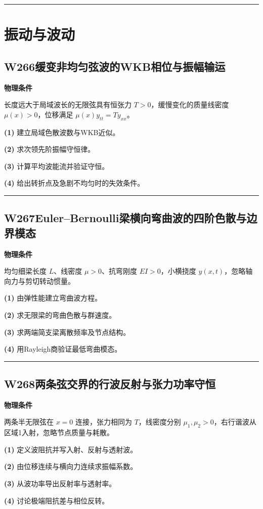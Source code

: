 \documentclass[UTF8,a4paper,11pt,oneside,openany]{ctexbook}
\begin{document}
\par\bigskip\hrule\bigskip
\chapter{振动与波动}
\section*{W266\quad 缓变非均匀弦波的WKB相位与振幅输运}
\textbf{物理条件}\par 长度远大于局域波长的无限弦具有恒张力 \(T>0\)，缓慢变化的质量线密度 \(\mu(x)>0\)，位移满足 \(\mu(x)y_{tt}=Ty_{xx}\)。
\par\noindent\textbf{(1)} 建立局域色散波数与WKB近似。
\par\noindent\textbf{(2)} 求次领先阶振幅守恒律。
\par\noindent\textbf{(3)} 计算平均波能流并验证守恒。
\par\noindent\textbf{(4)} 给出转折点及急剧不均匀时的失效条件。

\par\bigskip\hrule\bigskip
\section*{W267\quad Euler–Bernoulli梁横向弯曲波的四阶色散与边界模态}
\textbf{物理条件}\par 均匀细梁长度 \(L\)、线密度 \(\mu>0\)、抗弯刚度 \(EI>0\)，小横挠度 \(y(x,t)\)，忽略轴向力与剪切转动惯量。
\par\noindent\textbf{(1)} 由弹性能建立弯曲波方程。
\par\noindent\textbf{(2)} 求无限梁的弯曲色散与群速度。
\par\noindent\textbf{(3)} 求两端简支梁离散频率及节点结构。
\par\noindent\textbf{(4)} 用Rayleigh商验证最低弯曲模态。

\par\bigskip\hrule\bigskip
\section*{W268\quad 两条弦交界的行波反射与张力功率守恒}
\textbf{物理条件}\par 两条半无限弦在 \(x=0\) 连接，张力相同为 \(T\)，线密度分别 \(\mu_1,\mu_2>0\)，右行谐波从区域1入射，忽略节点质量与耗散。
\par\noindent\textbf{(1)} 定义波阻抗并写入射、反射与透射波。
\par\noindent\textbf{(2)} 由位移连续与横向力连续求振幅系数。
\par\noindent\textbf{(3)} 从波功率导出反射率与透射率。
\par\noindent\textbf{(4)} 讨论极端阻抗差与相位反转。
\end{document}
